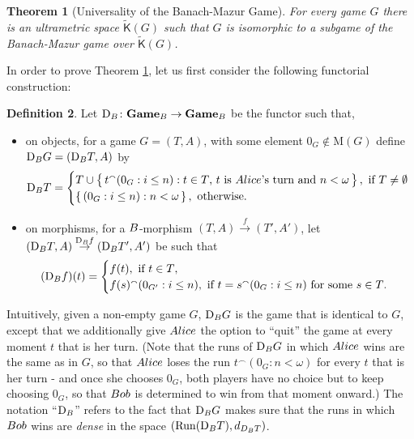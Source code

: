 \documentclass[12pt]{amsart}
\newtheorem{thm}{Theorem}[section]
\theoremstyle{definition}
\newtheorem{defn}[thm]{Definition}
\newcommand{\set}[1]{\left\{\, {#1} \,\right\}}
\newcommand{\seq}[1]{{\left( {#1} \right)}}
\newcommand{\ali}{\textup{\textmd{\textsc{Alice}}}}
\newcommand{\bob}{\textup{\textmd{\textsc{Bob}}}}
\newcommand{\B}{\textup{\textmd{\textsc{B}}}}
\newcommand{\Run}{{\mathrm{Run}}}
\newcommand{\M}{\mathrm{M}}
\newcommand{\K}{\mathsf{K}}
\newcommand{\D}{\mathrm{D}}
\newcommand{\Games}{\mathbf{Game}}
\begin{document}
\begin{thm}[Universality of the Banach-Mazur Game]\label{THM_BMUniversal}
	For every game $G$ there is an ultrametric space $\tilde{\K}(G)$ such that $G$ is isomorphic to a subgame of the Banach-Mazur game over $\tilde{\K}(G)$.
\end{thm} 

In order to prove Theorem \ref{THM_BMUniversal}, let us first consider the following functorial construction:

\begin{defn}
	Let ${\D}_{\B}\colon \Games_{\B}\to \Games_{\B}$ be the functor such that,
	\begin{itemize}
		\item on objects, for a game $G = (T,A)$, with some element $0_G\not\in \M(G)$ define $\D_{\B}G= (\D_{\B} T,A)$ by
		\begin{equation}\label{eq_BMUni}
			\D_\B T = \begin{cases}
				T\cup \set{t^\smallfrown \seq{0_G:i\le n}: t\in T \text{, $t$ is $\ali$'s turn and $n<\omega$} }, \text{ if $T\neq\emptyset$}\\
				\set{\seq{0_G:i\le n}: n<\omega }, \text{ otherwise.}
			\end{cases}
		\end{equation}
		\item on morphisms, for a $\B$-morphism $(T,A)\stackrel{f}{\to}(T',A')$, let $(\D_{\B}T,A)\stackrel{\D_{\B}f}{\to}(\D_{\B}T',A')$ be such that
		\[
		(\D_{\B}f)(t) = \begin{cases}
			f(t), \text{ if $t\in T$},\\
			f(s)^\smallfrown \seq{0_{G'}:i\le n}, \text{ if $t=s^\smallfrown \seq{0_{G}:i\le n}$ for some $s\in T$.}
		\end{cases}
		\]
	\end{itemize}
\end{defn}

Intuitively, given a non-empty game $G$, $\D_{\B}G$ is the game that is identical to $G$, except that we additionally give $\ali$ the option to ``quit'' the game at every moment $t$ that is her turn. (Note that the runs of $\D_{\B}G$ in which $\ali$ wins are the same as in $G$, so that $\ali$ loses the run $t^\smallfrown \seq{0_G:n<\omega}$ for every $t$ that is her turn - and once she chooses $0_G$, both players have no choice but to keep choosing $0_G$, so that $\bob$ is determined to win from that moment onward.) The notation ``$\D_{\B}$''  refers to the fact that $\D_{\B}G$ makes sure that the runs in which $\bob$ wins are \textit{dense} in the space $(\Run(\D_{\B}T),d_{D_{\B}T})$.
\end{document}

